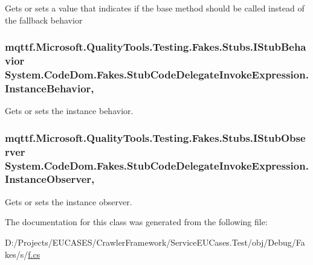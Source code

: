 Gets or sets a value that indicates if the base method should be called instead of the fallback behavior

\hypertarget{class_system_1_1_code_dom_1_1_fakes_1_1_stub_code_delegate_invoke_expression_a019511673e628634ae804a0c355a8e4a}{
\subsubsection[{Instance\-Behavior}]{\setlength{\rightskip}{0pt plus 5cm}mqttf.\-Microsoft.\-Quality\-Tools.\-Testing.\-Fakes.\-Stubs.\-I\-Stub\-Behavior System.\-Code\-Dom.\-Fakes.\-Stub\-Code\-Delegate\-Invoke\-Expression.\-Instance\-Behavior\hspace{0.3cm}{\ttfamily [get]}, {\ttfamily [set]}}}\label{class_system_1_1_code_dom_1_1_fakes_1_1_stub_code_delegate_invoke_expression_a019511673e628634ae804a0c355a8e4a}


Gets or sets the instance behavior.

\hypertarget{class_system_1_1_code_dom_1_1_fakes_1_1_stub_code_delegate_invoke_expression_a5ccf8383304af6d87633450dc3ebd582}{
\subsubsection[{Instance\-Observer}]{\setlength{\rightskip}{0pt plus 5cm}mqttf.\-Microsoft.\-Quality\-Tools.\-Testing.\-Fakes.\-Stubs.\-I\-Stub\-Observer System.\-Code\-Dom.\-Fakes.\-Stub\-Code\-Delegate\-Invoke\-Expression.\-Instance\-Observer\hspace{0.3cm}{\ttfamily [get]}, {\ttfamily [set]}}}\label{class_system_1_1_code_dom_1_1_fakes_1_1_stub_code_delegate_invoke_expression_a5ccf8383304af6d87633450dc3ebd582}


Gets or sets the instance observer.



The documentation for this class was generated from the following file\-:\begin{DoxyCompactItemize}
\item 
D\-:/\-Projects/\-E\-U\-C\-A\-S\-E\-S/\-Crawler\-Framework/\-Service\-E\-U\-Cases.\-Test/obj/\-Debug/\-Fakes/s/\hyperlink{s_2f_8cs}{f.\-cs}\end{DoxyCompactItemize}
